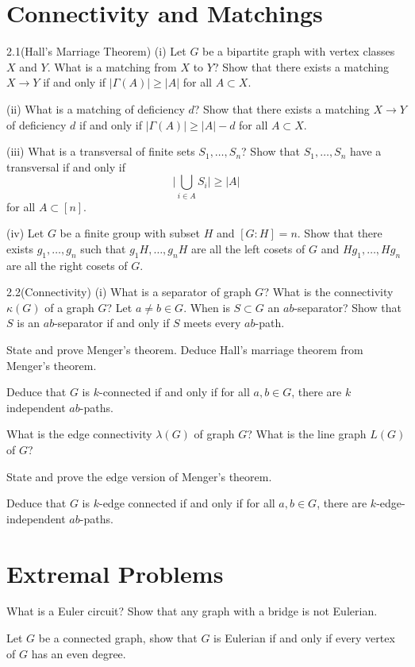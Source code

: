 \section{Connectivity and Matchings}
\begin{question}{2.1(Hall's Marriage Theorem)}
	(i) Let $G$ be a bipartite graph with vertex classes $X$ and $Y$. What is a matching from $X$ to $Y$?	Show that there exists a matching $X\rightarrow Y$ if and only if $|\Gamma(A)| \geq |A|$ for all $A \subset X$.
	
	(ii) What is a matching of deficiency $d$? Show that there exists a matching $X\rightarrow Y$ of deficiency $d$ if and only if $|\Gamma(A)| \geq |A| - d$ for all $A \subset X$.
	
	(iii) What is a transversal of finite sets $S_1,\dots,S_n$? Show that $S_1,\dots,S_n$ have a transversal if and only if \[\bigg|\bigcup_{i\in A}S_i \bigg| \geq |A|\] for all $A \subset [n]$.
	
	(iv) Let $G$ be a finite group with subset $H$ and $[G:H] = n$. Show that there exists $g_1,\dots,g_n$ such that $g_1H,\dots,g_n H$ are all the left cosets of $G$ and $Hg_1,\dots, Hg_n$ are all the right cosets of $G$.
\end{question}

\begin{question}{2.2(Connectivity)}
	(i) What is a separator of graph $G$? What is the connectivity $\kappa(G)$ of a graph $G$? Let $a \not = b \in G$. When is $S \subset G$ an $ab$-separator? Show that $S$ is an $ab$-separator if and only if $S$ meets every $ab$-path.
	
	State and prove Menger's theorem. Deduce Hall's marriage theorem from Menger's theorem.
	
	Deduce that $G$ is $k$-connected if and only if for all $a,b \in G$, there are $k$ independent $ab$-paths.
\end{question}

\begin{question}{2.4}
	What is the edge connectivity $\lambda(G)$ of graph $G$? What is the line graph $L(G)$ of $G$?
	
	State and prove the edge version of Menger's theorem.
	
	Deduce that $G$ is $k$-edge connected if and only if for all $a,b \in G$, there are $k$-edge-independent $ab$-paths.
\end{question}

\section{Extremal Problems}
\begin{question}{3.1}
	What is a Euler circuit? Show that any graph with a bridge is not Eulerian.
	
	Let $G$ be a connected graph,  show that $G$ is Eulerian if and only if every vertex of $G$ has an even degree.
\end{question}
	
